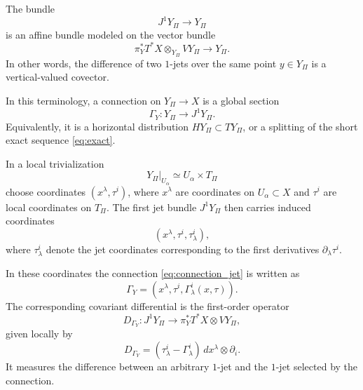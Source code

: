 \documentclass[11pt]{amsart}
\theoremstyle{plain}
\theoremstyle{definition}
\theoremstyle{remark}
\begin{document}
The bundle
\[
J^1Y_\Pi \to Y_\Pi
\]
is an affine bundle modeled on the vector bundle
\begin{equation}
	\pi_Y^*T^*X \otimes_{Y_\Pi} VY_\Pi \to Y_\Pi.
	\label{eq:jet_affine_model}
\end{equation}
In other words, the difference of two \(1\)-jets over the same point \(y\in Y_\Pi\) is a vertical-valued covector.

\medskip

In this terminology, a connection on \(Y_\Pi\to X\) is a global section
\begin{equation}
	\Gamma_Y: Y_\Pi \to J^1Y_\Pi.
	\label{eq:connection_jet}
\end{equation}
Equivalently, it is a horizontal distribution \(HY_\Pi\subset TY_\Pi\), or a splitting of the short exact sequence \eqref{eq:exact}.

In a local trivialization
\[
Y_\Pi|_{U_\alpha}\simeq U_\alpha\times T_\Pi
\]
choose coordinates \((x^\lambda,\tau^i)\), where \(x^\lambda\) are coordinates on \(U_\alpha\subset X\) and \(\tau^i\) are local coordinates on \(T_\Pi\). 
The first jet bundle \(J^1Y_\Pi\) then carries induced coordinates
\[
(x^\lambda,\tau^i,\tau^i_\lambda),
\]
where \(\tau^i_\lambda\) denote the jet coordinates corresponding to the first derivatives \(\partial_\lambda\tau^i\).

In these coordinates the connection \eqref{eq:connection_jet} is written as
\begin{equation}
	\Gamma_Y
	=
	(x^\lambda,\tau^i,\Gamma^i_\lambda(x,\tau)).
	\label{eq:connection_coordinates}
\end{equation}
The corresponding covariant differential is the first-order operator
\begin{equation}
	D_{\Gamma_Y}: J^1Y_\Pi \to \pi_Y^*T^*X \otimes VY_\Pi,
	\label{eq:DGamma}
\end{equation}
given locally by
\begin{equation}
	D_{\Gamma_Y}
	=
	(\tau^i_\lambda-\Gamma^i_\lambda)\,
	dx^\lambda\otimes \partial_i.
	\label{eq:DGamma_formula}
\end{equation}
It measures the difference between an arbitrary \(1\)-jet and the \(1\)-jet selected by the connection.

\medskip
\end{document}
